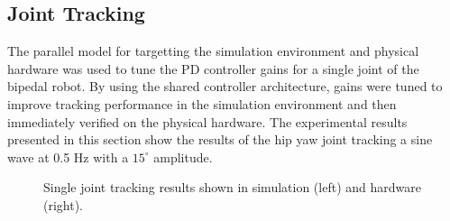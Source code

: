 \subsection{Joint Tracking} %
\label{sub:joint_tracking}
The parallel model for targetting the simulation environment and physical hardware was used to tune the PD controller gains for a single joint of the bipedal robot. By using the shared controller architecture, gains were tuned to improve tracking performance in the simulation environment and then immediately verified on the physical hardware. The experimental results presented in this section show the results of the hip yaw joint tracking a sine wave at 0.5 Hz with a $15^{\circ}$ amplitude.

\begin{figure}[!h]
	\begin{center}
	\end{center}
  	\caption{Single joint tracking results shown in simulation (left) and hardware (right).}
	\label{fig:tracking1dof}
\end{figure} 

